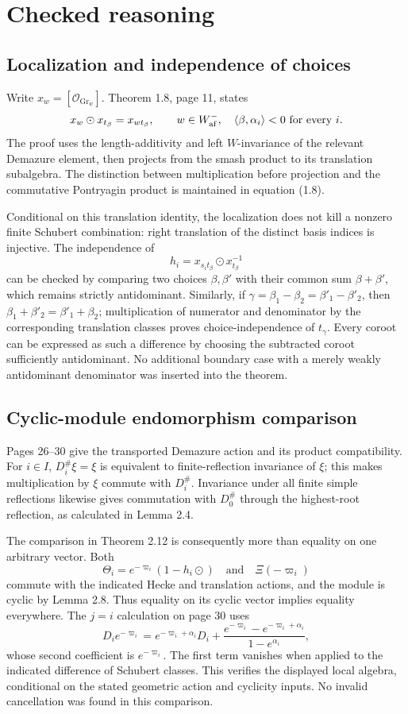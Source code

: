\documentclass[10pt]{article}
\begin{document}
\section*{Checked reasoning}
\subsection*{Localization and independence of choices}
Write \(x_w=[\mathcal O_{\operatorname{Gr}_w}]\). Theorem 1.8, page 11, states \[x_w\odot x_{t_\beta}=x_{wt_\beta},
 \qquad w\in W_{\rm af}^{-},\quad
 \langle\beta,\alpha_i\rangle<0\ \text{for every }i.\] The proof uses the length-additivity and left \(W\)-invariance of the relevant Demazure element, then projects from the smash product to its translation subalgebra. The distinction between multiplication before projection and the commutative Pontryagin product is maintained in equation (1.8).\par
Conditional on this translation identity, the localization does not kill a nonzero finite Schubert combination: right translation of the distinct basis indices is injective. The independence of \[h_i=x_{s_it_\beta}\odot x_{t_\beta}^{-1}\] can be checked by comparing two choices \(\beta,\beta'\) with their common sum \(\beta+\beta'\), which remains strictly antidominant. Similarly, if \(\gamma=\beta_1-\beta_2=\beta'_1-\beta'_2\), then \(\beta_1+\beta'_2=\beta'_1+\beta_2\); multiplication of numerator and denominator by the corresponding translation classes proves choice-independence of \(t_\gamma\). Every coroot can be expressed as such a difference by choosing the subtracted coroot sufficiently antidominant. No additional boundary case with a merely weakly antidominant denominator was inserted into the theorem.\par
\subsection*{Cyclic-module endomorphism comparison}
Pages 26–30 give the transported Demazure action and its product compatibility. For \(i\in I\), \(D_i^\#\xi=\xi\) is equivalent to finite-reflection invariance of \(\xi\); this makes multiplication by \(\xi\) commute with \(D_i^\#\). Invariance under all finite simple reflections likewise gives commutation with \(D_0^\#\) through the highest-root reflection, as calculated in Lemma 2.4.\par
The comparison in Theorem 2.12 is consequently more than equality on one arbitrary vector. Both \[\Theta_i=e^{-\varpi_i}(1-h_i\odot)
 \quad\text{and}\quad \Xi(-\varpi_i)\] commute with the indicated Hecke and translation actions, and the module is cyclic by Lemma 2.8. Thus equality on its cyclic vector implies equality everywhere. The \(j=i\) calculation on page 30 uses \[D_i e^{-\varpi_i}
 =e^{-\varpi_i+\alpha_i}D_i+
   \frac{e^{-\varpi_i}-e^{-\varpi_i+\alpha_i}}{1-e^{\alpha_i}},\] whose second coefficient is \(e^{-\varpi_i}\). The first term vanishes when applied to the indicated difference of Schubert classes. This verifies the displayed local algebra, conditional on the stated geometric action and cyclicity inputs. No invalid cancellation was found in this comparison.\par
\end{document}
